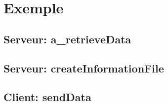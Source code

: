 \documentclass[11pt]{beamer}
\begin{document}
\section{Exemple}

	\subsection*{Serveur: a\_retrieveData}

		\begin{frame}
			
		\end{frame}

		\begin{frame}
			
		\end{frame}

		\begin{frame}
			
		\end{frame}

		\begin{frame}
			
		\end{frame}

		\begin{frame}
			
		\end{frame}

		\begin{frame}
			
		\end{frame}

		\begin{frame}
			
		\end{frame}

	\subsection*{Serveur: createInformationFile}

		\begin{frame}
			
		\end{frame}

		\begin{frame}
			
		\end{frame}

	\subsection*{Client: sendData}
	
		\begin{frame}
			
		\end{frame}
\end{document}
